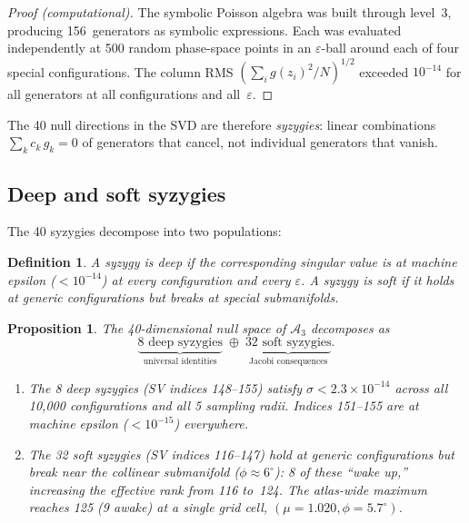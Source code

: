 \documentclass[11pt,a4paper]{article}
\newtheorem{proposition}[theorem]{Proposition}
\newtheorem{definition}[theorem]{Definition}
\theoremstyle{remark}
\newcommand{\cA}{\mathcal{A}}
\begin{document}
\begin{proof}[Proof (computational)]
The symbolic Poisson algebra was built through level~3,
producing 156~generators as symbolic expressions.  Each
was evaluated independently at 500 random phase-space
points in an $\varepsilon$-ball around each of four
special configurations.  The column RMS
$(\sum_i g(z_i)^2 / N)^{1/2}$ exceeded $10^{-14}$ for
all generators at all configurations and all~$\varepsilon$.
\end{proof}

The 40 null directions in the SVD are therefore
\emph{syzygies}: linear combinations
$\sum_k c_k\, g_k = 0$ of generators that cancel,
not individual generators that vanish.

\subsection{Deep and soft syzygies}

The 40 syzygies decompose into two populations:

\begin{definition}
A syzygy is \emph{deep} if the corresponding singular
value is at machine epsilon ($< 10^{-14}$) at every
configuration and every $\varepsilon$.  A syzygy is
\emph{soft} if it holds at generic configurations but
breaks at special submanifolds.
\end{definition}

\begin{proposition}
\label{prop:syzygy-decomp}
The 40-dimensional null space of $\cA_3$ decomposes as
\[
  \underbrace{8\text{ deep syzygies}}_{\text{universal
    identities}} \;\oplus\;
  \underbrace{32\text{ soft syzygies}}_{\text{Jacobi
    consequences}}.
\]
\begin{enumerate}[nosep]
  \item The 8 deep syzygies (SV indices 148--155) satisfy
    $\sigma < 2.3 \times 10^{-14}$ across all
    10{,}000 configurations and all 5 sampling radii.
    Indices 151--155 are at machine epsilon
    ($< 10^{-15}$) everywhere.

  \item The 32 soft syzygies (SV indices 116--147) hold
    at generic configurations but break near the
    collinear submanifold ($\phi \approx 6^\circ$): 8 of
    these ``wake up,'' increasing the effective rank
    from 116 to~124.  The atlas-wide maximum reaches
    125 (9 awake) at a single grid cell,
    $(\mu = 1.020, \phi = 5.7^\circ)$.
\end{enumerate}
\end{proposition}
\end{document}
